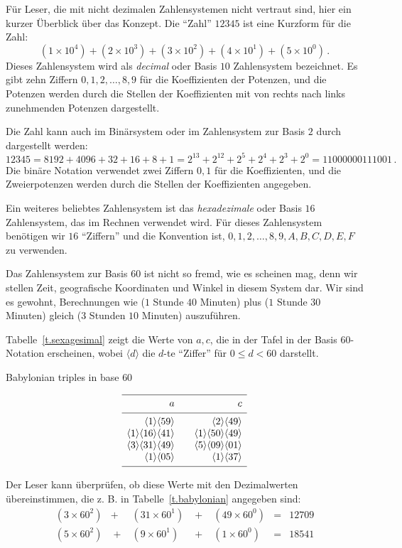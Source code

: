 Für Leser, die mit nicht dezimalen Zahlensystemen nicht vertraut sind, hier ein kurzer Überblick über das Konzept. Die ``Zahl'' $12345$ ist eine Kurzform für die Zahl:
\[
(1\times 10^4) + (2\times 10^3) + (3\times 10^2) + (4\times 10^1) + (5\times 10^0)\,.
\]
Dieses Zahlensystem wird als \emph{decimal} oder Basis $10$ Zahlensystem bezeichnet. Es gibt zehn Ziffern $0,1,2,\ldots,8,9$ für die Koeffizienten der Potenzen, und die Potenzen werden durch die Stellen der Koeffizienten mit von rechts nach links zunehmenden Potenzen dargestellt. 

Die Zahl kann auch im Binärsystem oder im Zahlensystem zur Basis $2$ durch dargestellt werden:
\[
12345=8192 + 4096 + 32+16+8+1=
2^{13} + 2^{12} + 2^{5} + 2^{4} + 2^{3} + 2^0=11000000111001\,.
\]
Die binäre Notation verwendet zwei Ziffern $0,1$ für die Koeffizienten, und die Zweierpotenzen werden durch die Stellen der Koeffizienten angegeben.

Ein weiteres beliebtes Zahlensystem ist das \emph{hexadezimale} oder Basis $16$ Zahlensystem, das im Rechnen verwendet wird. Für dieses Zahlensystem benötigen wir $16$ ``Ziffern'' und die Konvention ist, $0,1,2,\ldots,8,9,A,B,C,D,E,F$ zu verwenden.

Das Zahlensystem zur Basis $60$ ist nicht so fremd, wie es scheinen mag, denn wir stellen Zeit, geografische Koordinaten und Winkel in diesem System dar. Wir sind es gewohnt, Berechnungen wie ($1$ Stunde $40$ Minuten) plus ($1$ Stunde $30$ Minuten) gleich ($3$ Stunden $10$ Minuten) auszuführen.

Tabelle~\ref{t.sexagesimal} zeigt die Werte von $a,c$, die in der Tafel in der Basis $60$-Notation erscheinen, wobei $\langle d\rangle$ die $d$-te ``Ziffer'' für $0\leq d<60$ darstellt.
\begin{table}[t]
\caption{Babylonian triples in base $60$}\label{t.sexagesimal}
\[
\begin{array}{r@{$\quad\quad$}r}
\hline
\noalign{\smallskip}
a&c\\
\noalign{\smallskip}\hline\noalign{\smallskip}
\langle 1\rangle \langle 59 \rangle&\langle 2\rangle \langle 49 \rangle\\
\langle 1\rangle \langle 16 \rangle\langle 41\rangle&\langle 1\rangle \langle 50 \rangle\langle 49\rangle\\
\langle 3\rangle \langle 31 \rangle\langle 49\rangle&\langle 5\rangle \langle 09 \rangle\langle 01\rangle\\
\langle 1\rangle \langle 05 \rangle&\langle 1\rangle \langle 37 \rangle\\
\noalign{\smallskip}\hline
\end{array}
\]
\end{table}
Der Leser kann überprüfen, ob diese Werte mit den Dezimalwerten übereinstimmen, die z. B. in Tabelle~\ref{t.babylonian} angegeben sind:
\[
\renewcommand{\arraystretch}{1.3}
\begin{array}{lclclcr}
(3\times 60^2) &+& (31\times 60^1) &\;+\;& (49\times 60^0) &=&   12709\\
(5\times 60^2) &\;+\;& (9\times 60^1) &\;+\;& (1\times 60^0) &=& 18541
\end{array}
\]

